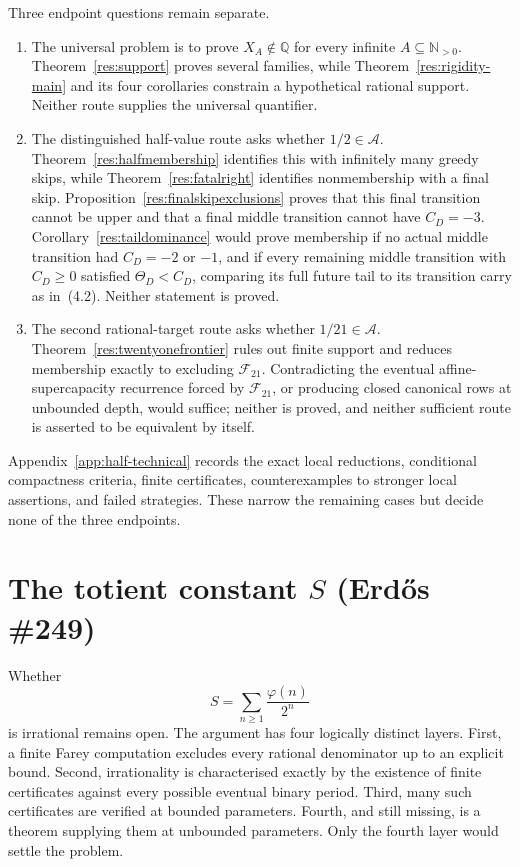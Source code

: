 \documentclass[11pt]{article}
\theoremstyle{definition}
\theoremstyle{remark}
\newcommand{\Npos}{\mathbb{N}_{>0}}
\newcommand{\Q}{\mathbb{Q}}
\newcommand{\ph}{\varphi}
\begin{document}
Three endpoint questions remain separate.
\begin{enumerate}[label=\textup{(\alph*)},leftmargin=2.2em]
\item The universal problem is to prove \(X_A\notin\Q\) for every infinite
\(A\subseteq\Npos\).  Theorem~\ref{res:support} proves several
families, while Theorem~\ref{res:rigidity-main} and its four corollaries
constrain a hypothetical rational support.  Neither route supplies the
universal quantifier.
\item The distinguished half-value route asks whether \(1/2\in\mathcal A\).
Theorem~\ref{res:halfmembership} identifies this with infinitely many greedy
skips, while Theorem~\ref{res:fatalright} identifies nonmembership with a
final skip.  Proposition~\ref{res:finalskipexclusions} proves that this final
transition cannot be upper and that a final middle transition cannot have
\(C_D=-3\).  Corollary~\ref{res:taildominance} would prove membership if no
actual middle transition had \(C_D=-2\) or \(-1\), and if every remaining
middle transition with \(C_D\geq0\) satisfied
\(\Theta_D<C_D\), comparing its full future tail to its transition carry
as in~\textup{(4.2)}.  Neither statement is proved.
\item The second rational-target route asks whether \(1/21\in\mathcal A\).
Theorem~\ref{res:twentyonefrontier} rules out finite support and reduces
membership exactly to excluding \(\mathcal F_{21}\).  Contradicting the
eventual affine-supercapacity recurrence forced by \(\mathcal F_{21}\), or
producing closed canonical rows at unbounded depth, would suffice; neither is
proved, and neither sufficient route is asserted to be equivalent by itself.
\end{enumerate}
Appendix~\ref{app:half-technical} records the exact local reductions,
conditional compactness criteria, finite certificates, counterexamples to
stronger local assertions, and failed strategies.  These narrow the remaining
cases but decide none of the three endpoints.

\section{The totient constant $S$ (Erd\H{o}s \#249)}\label{sec:249}

Whether
\[
S=\sum_{n\ge1}\frac{\ph(n)}{2^n}
\]
is irrational remains open.  The argument has four logically distinct
layers.  First, a finite Farey computation excludes every rational
denominator up to an explicit bound.  Second, irrationality is characterised
exactly by the existence of finite certificates against every possible
eventual binary period.  Third, many such certificates are verified at
bounded parameters.  Fourth, and still missing, is a theorem supplying them
at unbounded parameters.  Only the fourth layer would settle the problem.
\end{document}
